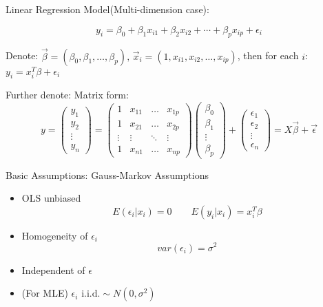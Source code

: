 \begin{point}
    Linear Regression Model(Multi-dimension case):
\end{point}

    
\[
    y_i=\beta_0+\beta_1x_{i1}+\beta_2x_{i2}+\cdots+\beta_px_{ip}+\epsilon_i    
\]

    Denote: $\vec{\beta}=(\beta_0,\beta_1,\ldots,\beta_p),\, \vec{x}_i=(1,x_{i1},x_{i2},\ldots,x_{ip})$, then for each $i$: $y_i=x_i^T\beta+\epsilon_i$

    Further denote: Matrix form:
    \begin{equation}\label{EqaMatrixRepreOfSSE}
        y=\begin{pmatrix}
            y_1\\
            y_2\\
            \vdots\\
            y_n
        \end{pmatrix}  
        =
        \begin{pmatrix}
            1&x_{11}&\ldots&x_{1p}\\
            1&x_{21}&\ldots&x_{2p}\\
            \vdots&\vdots&\ddots&\vdots\\
            1&x_{n1}&\ldots&x_{np}
        \end{pmatrix}
        \begin{pmatrix}
            \beta_0\\
            \beta_1\\
            \vdots\\
            \beta_p
        \end{pmatrix}
        +
        \begin{pmatrix}
            \epsilon_1\\
            \epsilon_2\\
            \vdots\\
            \epsilon_n
        \end{pmatrix}
        =X\vec{\beta}+\vec{\epsilon}
    \end{equation}

    Basic Assumptions: Gauss-Markov Assumptions
    \begin{itemize}
        \item OLS unbiased\[E(\epsilon_i|x_i)=0\qquad E(y_i|x_i)=x_i^T\beta\]
        \item Homogeneity of $\epsilon_i$\[var(\epsilon_i)=\sigma^2\]
        \item Independent of $\epsilon$
        \item (For MLE) $\epsilon_i\text{ i.i.d.}\sim N(0,\sigma^2)$
    \end{itemize}

